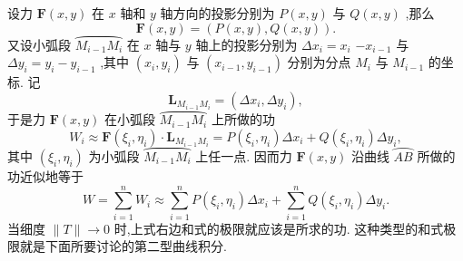 设力 \(\mathbf{F}\left( {x,y}\right)\) 在 \(x\) 轴和 \(y\) 轴方向的投影分别为 \(P\left( {x,y}\right)\) 与 \(Q\left( {x,y}\right)\) ,那么
\[
\mathbf{F}\left( {x,y}\right)  = \left( {P\left( {x,y}\right) ,Q\left( {x,y}\right) }\right) .
\]
又设小弧段 \(\overset{⏜}{{M}_{i - 1}{M}_{i}}\) 在 \(x\) 轴与 \(y\) 轴上的投影分别为 \(\Delta {x}_{i} = {x}_{i}\)  \(- {x}_{i - 1}\) 与 \(\Delta {y}_{i} = {y}_{i} - {y}_{i - 1}\) ,其中 \(\left( {{x}_{i},{y}_{i}}\right)\) 与 \(\left( {{x}_{i - 1},{y}_{i - 1}}\right)\) 分别为分点 \({M}_{i}\) 与 \({M}_{i - 1}\) 的坐标. 记
\[
{\mathbf{L}}_{{M}_{i - 1}{M}_{i}} = \left( {\Delta {x}_{i},\Delta {y}_{i}}\right) ,
\]
于是力 \(\mathbf{F}\left( {x,y}\right)\) 在小弧段 \(\overset{⏜}{{M}_{i - 1}{M}_{i}}\) 上所做的功
\[
{W}_{i} \approx  \mathbf{F}\left( {{\xi }_{i},{\eta }_{i}}\right)  \cdot  {\mathbf{L}}_{{M}_{i - 1}{M}_{i}} = P\left( {{\xi }_{i},{\eta }_{i}}\right) \Delta {x}_{i} + Q\left( {{\xi }_{i},{\eta }_{i}}\right) \Delta {y}_{i},
\]
其中 \(\left( {{\xi }_{i},{\eta }_{i}}\right)\) 为小弧段 \(\overset{⏜}{{M}_{i - 1}{M}_{i}}\) 上任一点. 因而力 \(\mathbf{F}\left( {x,y}\right)\) 沿曲线 \(\overset{⏜}{AB}\) 所做的功近似地等于
\[
W = \mathop{\sum }\limits_{{i = 1}}^{n}{W}_{i} \approx  \mathop{\sum }\limits_{{i = 1}}^{n}P\left( {{\xi }_{i},{\eta }_{i}}\right) \Delta {x}_{i} + \mathop{\sum }\limits_{{i = 1}}^{n}Q\left( {{\xi }_{i},{\eta }_{i}}\right) \Delta {y}_{i}.
\]
当细度 \(\parallel T\parallel  \rightarrow  0\) 时,上式右边和式的极限就应该是所求的功. 这种类型的和式极限就是下面所要讨论的第二型曲线积分.

